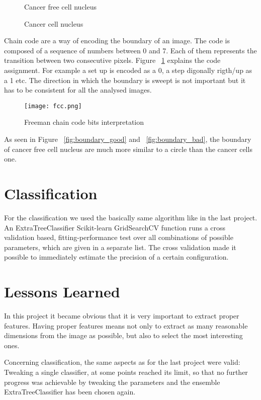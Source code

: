 \documentclass[a4paper, 11pt]{article}
\begin{document}
\begin{figure}[!tbp]
	\centering
	\qquad
	\caption{Cancer free cell nucleus}
\end{figure}
	
	\begin{figure}[!tbp]
		\centering
		\qquad
		\caption{Cancer cell nucleus} 
	\end{figure}
	
	Chain code are a way of encoding the boundary of an image. The code is composed of a sequence of numbers between 0 and 7. Each of them represents the transition between two consecutive pixels. Figure ~\ref{fig:fcc} explains the code assignment. For example a set up is encoded as a 0, a step digonally rigth/up as a 1 etc. The direction in which the boundary is sweept is not important but it has to be consistent for all the analysed images.
	
	\begin{figure}[h]
		\centering
		\texttt{[image: fcc.png]}
		\caption{Freeman chain code bits interpretation}
		\label{fig:fcc}
	\end{figure}
	
	As seen in Figure ~\ref{fig:boundary_good} and ~\ref{fig:boundary_bad}, the boundary of cancer free cell nucleus are much more similar to a circle than the cancer cells one. 


	\section{Classification}
	For the classification we used the basically same algorithm like in the last project. An ExtraTreeClassifier 
	Scikit-learn GridSearchCV function runs a cross validation based, fitting-performance test over all combinations of possible parameters, which are given in a separate list. The cross validation made it possible to immediately estimate the precision of a certain configuration. 
	
	\section{Lessons Learned} 
	In this project it became obvious that it is very important to extract proper features. Having proper features means not only to extract as many reasonable dimensions from the image as possible, but also to select the most interesting ones.

	Concerning classification, the same aspects as for the last project were valid: Tweaking a single classifier, at some points reached its limit, so that no further progress was achievable by tweaking the parameters and the ensemble ExtraTreeClassifier has been chosen again.
	
\end{document}
